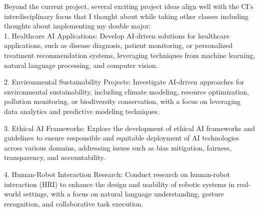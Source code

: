 \documentclass[paper=a4, fontsize=11pt,twoside]{scrartcl}
\begin{document}
Beyond the current project, several exciting project ideas align well with the CI's interdisciplinary focus that I thought about while taking other classes including thoughts about implementing my double major: \\

1. Healthcare AI Applications: Develop AI-driven solutions for healthcare applications, such as disease diagnosis, patient monitoring, or personalized treatment recommendation systems, leveraging techniques from machine learning, natural language processing, and computer vision.

2. Environmental Sustainability Projects: Investigate AI-driven approaches for environmental sustainability, including climate modeling, resource optimization, pollution monitoring, or biodiversity conservation, with a focus on leveraging data analytics and predictive modeling techniques.

3. Ethical AI Frameworks: Explore the development of ethical AI frameworks and guidelines to ensure responsible and equitable deployment of AI technologies across various domains, addressing issues such as bias mitigation, fairness, transparency, and accountability.

4. Human-Robot Interaction Research: Conduct research on human-robot interaction (HRI) to enhance the design and usability of robotic systems in real-world settings, with a focus on natural language understanding, gesture recognition, and collaborative task execution.
\end{document}
